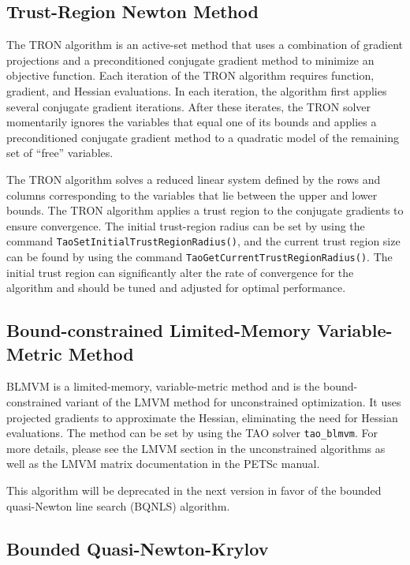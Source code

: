 \documentclass[]{book}
\begin{document}
\subsection{Trust-Region Newton Method}\label{sec:tron}%
The TRON \cite{lin_c3} algorithm is an active-set method that uses a 
combination of gradient projections and 
a preconditioned conjugate gradient method to minimize an objective function.
Each iteration of the TRON algorithm requires function, gradient, 
and Hessian evaluations.  In each iteration, the algorithm
first applies several conjugate gradient iterations.  
After these iterates, the TRON solver momentarily ignores the variables
that equal one of its bounds and
applies a preconditioned conjugate gradient method to a
quadratic model of the remaining set of ``free'' variables.  

The TRON algorithm solves a reduced linear system
defined by the rows and columns corresponding to the variables that
lie between the upper and lower bounds.
The TRON algorithm applies a trust region to the 
conjugate gradients to ensure convergence.  The initial trust-region
radius
can be set by using the command 
{\tt Tao\-Set\-Initial\-Trust\-Region\-Radius()},
and the current trust region size can be found by using the command
{\tt Tao\-Get\-Current\-Trust\-Region\-Radius()}.
The initial trust region can significantly alter the 
rate of convergence for the algorithm and should be
tuned and adjusted for optimal performance.

\subsection{Bound-constrained Limited-Memory Variable-Metric Method}
\label{sec:blmvm}

BLMVM is a limited-memory, variable-metric method and is 
the bound-constrained variant of the LMVM method for
unconstrained optimization. It uses projected gradients to approximate
the Hessian, eliminating the need for Hessian evaluations.
The method can be set by using the TAO solver {\tt tao\_blmvm}. For more details, 
please see the LMVM section in the unconstrained algorithms as well as the 
LMVM matrix documentation in the PETSc manual.

This algorithm will be deprecated in the next version in favor of the bounded quasi-Newton 
line search (BQNLS) algorithm.

\subsection{Bounded Quasi-Newton-Krylov}\label{sec:bqnk}
\end{document}
